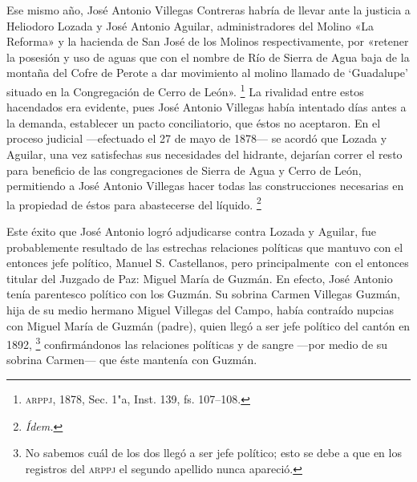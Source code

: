 \documentclass[14pt,twoside,final]{extbook} %
\let\oldfootnote\footnote
\renewcommand\footnote[1]{%
\oldfootnote{\hspace{1mm}#1}}
\begin{document}
Ese mismo año, José Antonio Villegas Contreras habría de llevar ante la justicia a Heliodoro Lozada y José Antonio Aguilar, administradores del Molino «La Reforma» y la hacienda de San José de los Molinos respectivamente, por «retener la posesión y uso de aguas que con el nombre de Río de Sierra de Agua baja de la montaña del Cofre de Perote a dar movimiento al molino llamado de  `Guadalupe' situado en la Congregación de Cerro de León».\footnote{\textsc{arppj}, 1878, Sec. 1"a, Inst. 139, fs. 107--108.} La rivalidad entre estos hacendados era evidente, pues José Antonio Villegas había intentado días antes a la demanda, establecer un pacto conciliatorio, que éstos no aceptaron. En el proceso judicial ---efectuado el 27 de mayo de 1878--- se acordó que Lozada y Aguilar, una vez satisfechas sus necesidades del hidrante, dejarían correr el resto para beneficio de las congregaciones de Sierra de Agua y Cerro de León, permitiendo a José Antonio Villegas hacer todas las construcciones necesarias en la propiedad de éstos para abastecerse del líquido.\footnote{\em Ídem.}

Este éxito que José Antonio logró adjudicarse contra Lozada y Aguilar, fue probablemente resultado de las estrechas relaciones políticas que mantuvo con el entonces jefe político, Manuel S. Castellanos, pero principalmente~con el entonces titular del Juzgado de Paz: Miguel María de Guzmán. En efecto, José Antonio tenía parentesco político con los Guzmán. Su sobrina Carmen Villegas Guzmán, hija de su medio hermano Miguel Villegas del Campo, había contraído nupcias con Miguel María de Guzmán (padre), quien llegó a ser jefe político del cantón en 1892,\footnote{No sabemos cuál de los dos llegó a ser jefe político; esto se debe a que en los registros del \textsc{arppj} el segundo apellido nunca apareció.} confirmándonos las relaciones políticas y de sangre ---por medio de su sobrina Carmen--- que éste mantenía con Guzmán.
\end{document}
